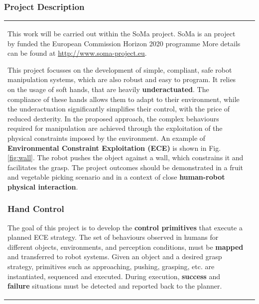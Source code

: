 
\subsubsection{Project Description}
\hspace*{-10pt}\begin{tabular}{m{11.5cm} m{4cm}}
This work will be carried out within the SoMa project.
SoMa is an project by funded the European Commission Horizon 2020 programme
More details can be found at 
\url{http://www.soma-project.eu}.

This project focusses on the development of {simple, compliant, safe robot manipulation} systems, which are also {robust} and {easy to program}.
It relies on the usage of {soft hands}, that are heavily \textbf{underactuated}.
The compliance of these hands allows them to {adapt} to their environment, while the underactuation significantly simplifies their control, with the price of reduced dexterity.
In the proposed approach, the {complex behaviours} required for manipulation are achieved through the exploitation of the physical constraints imposed by the environment.
An example of \textbf{Environmental Constraint Exploitation (ECE)} is shown in Fig.\ref{fig:wall}. The robot pushes the object against a wall, which constrains it and facilitates the grasp.
The project outcomes should be demonstrated in a fruit and vegetable picking scenario and in a context of close \textbf{human-robot physical interaction}.


\subsubsection{Hand Control}
The goal of this project is to develop the \textbf{control primitives} that execute a planned ECE strategy.
The set of behaviours observed in humans for different objects, environments, and perception conditions, must be \textbf{mapped} and transferred to robot systems.
Given an object and a desired grasp strategy, primitives such as approaching, pushing, grasping, etc. are instantiated, sequenced and executed. During execution, \textbf{success} and \textbf{failure} situations must be detected and reported back to the planner.



\end{tabular}
